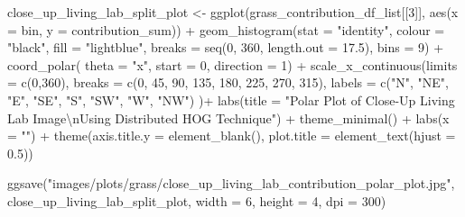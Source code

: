 \documentclass[
  letterpaper,
  DIV=11,
  numbers=noendperiod]{scrreprt}
\newenvironment{Shaded}{\begin{snugshade}}{\end{snugshade}}
\newcommand{\AttributeTok}[1]{\textcolor[rgb]{0.40,0.45,0.13}{#1}}
\newcommand{\DecValTok}[1]{\textcolor[rgb]{0.68,0.00,0.00}{#1}}
\newcommand{\FloatTok}[1]{\textcolor[rgb]{0.68,0.00,0.00}{#1}}
\newcommand{\FunctionTok}[1]{\textcolor[rgb]{0.28,0.35,0.67}{#1}}
\newcommand{\NormalTok}[1]{\textcolor[rgb]{0.00,0.23,0.31}{#1}}
\newcommand{\OtherTok}[1]{\textcolor[rgb]{0.00,0.23,0.31}{#1}}
\newcommand{\SpecialCharTok}[1]{\textcolor[rgb]{0.37,0.37,0.37}{#1}}
\newcommand{\StringTok}[1]{\textcolor[rgb]{0.13,0.47,0.30}{#1}}
\begin{document}
\begin{Shaded}
\begin{Highlighting}[]
\NormalTok{close\_up\_living\_lab\_split\_plot }\OtherTok{\textless{}{-}}
  \FunctionTok{ggplot}\NormalTok{(grass\_contribution\_df\_list[[}\DecValTok{3}\NormalTok{]], }
         \FunctionTok{aes}\NormalTok{(}\AttributeTok{x =}\NormalTok{ bin, }\AttributeTok{y =}\NormalTok{ contribution\_sum)) }\SpecialCharTok{+}
  \FunctionTok{geom\_histogram}\NormalTok{(}\AttributeTok{stat =} \StringTok{"identity"}\NormalTok{,}
                 \AttributeTok{colour =} \StringTok{"black"}\NormalTok{, }
                 \AttributeTok{fill =} \StringTok{"lightblue"}\NormalTok{, }
                 \AttributeTok{breaks =} \FunctionTok{seq}\NormalTok{(}\DecValTok{0}\NormalTok{, }\DecValTok{360}\NormalTok{, }\AttributeTok{length.out =} \FloatTok{17.5}\NormalTok{),}
                 \AttributeTok{bins =} \DecValTok{9}\NormalTok{) }\SpecialCharTok{+}
  \FunctionTok{coord\_polar}\NormalTok{(}
    \AttributeTok{theta =} \StringTok{"x"}\NormalTok{, }
    \AttributeTok{start =} \DecValTok{0}\NormalTok{, }
    \AttributeTok{direction =} \DecValTok{1}\NormalTok{) }\SpecialCharTok{+}
  \FunctionTok{scale\_x\_continuous}\NormalTok{(}\AttributeTok{limits =} \FunctionTok{c}\NormalTok{(}\DecValTok{0}\NormalTok{,}\DecValTok{360}\NormalTok{),}
    \AttributeTok{breaks =} \FunctionTok{c}\NormalTok{(}\DecValTok{0}\NormalTok{, }\DecValTok{45}\NormalTok{, }\DecValTok{90}\NormalTok{, }\DecValTok{135}\NormalTok{, }\DecValTok{180}\NormalTok{, }\DecValTok{225}\NormalTok{, }\DecValTok{270}\NormalTok{, }\DecValTok{315}\NormalTok{), }
    \AttributeTok{labels =} \FunctionTok{c}\NormalTok{(}\StringTok{"N"}\NormalTok{, }\StringTok{"NE"}\NormalTok{, }\StringTok{"E"}\NormalTok{, }\StringTok{"SE"}\NormalTok{, }\StringTok{"S"}\NormalTok{, }\StringTok{"SW"}\NormalTok{, }\StringTok{"W"}\NormalTok{, }\StringTok{"NW"}\NormalTok{)}
\NormalTok{  )}\SpecialCharTok{+}
  \FunctionTok{labs}\NormalTok{(}\AttributeTok{title =} \StringTok{"Polar Plot of Close{-}Up Living Lab Image}\SpecialCharTok{\textbackslash{}n}\StringTok{Using Distributed HOG Technique"}\NormalTok{) }\SpecialCharTok{+}
  \FunctionTok{theme\_minimal}\NormalTok{() }\SpecialCharTok{+}
  \FunctionTok{labs}\NormalTok{(}\AttributeTok{x =} \StringTok{""}\NormalTok{) }\SpecialCharTok{+}
  \FunctionTok{theme}\NormalTok{(}\AttributeTok{axis.title.y =} \FunctionTok{element\_blank}\NormalTok{(),}
        \AttributeTok{plot.title =} \FunctionTok{element\_text}\NormalTok{(}\AttributeTok{hjust =} \FloatTok{0.5}\NormalTok{))}

\FunctionTok{ggsave}\NormalTok{(}\StringTok{"images/plots/grass/close\_up\_living\_lab\_contribution\_polar\_plot.jpg"}\NormalTok{, close\_up\_living\_lab\_split\_plot, }\AttributeTok{width =} \DecValTok{6}\NormalTok{, }\AttributeTok{height =} \DecValTok{4}\NormalTok{, }\AttributeTok{dpi =} \DecValTok{300}\NormalTok{)}
\end{Highlighting}
\end{Shaded}
\end{document}
